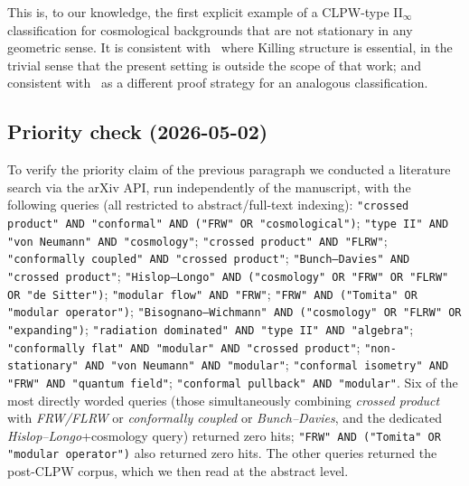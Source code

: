 \documentclass[11pt]{article}
\theoremstyle{definition}
\begin{document}
This is, to our knowledge, the first explicit example of a CLPW-type II$_\infty$ classification for cosmological backgrounds that are not stationary in any geometric sense. It is consistent with~\cite{FaulknerSperanza2024} where Killing structure is essential, in the trivial sense that the present setting is outside the scope of that work; and consistent with~\cite{CLPW2023, Witten2022} as a different proof strategy for an analogous classification.

\subsection*{Priority check (2026-05-02)}\label{sec:priority}

To verify the priority claim of the previous paragraph we conducted a literature search via the arXiv API, run independently of the manuscript, with the following queries (all restricted to abstract/full-text indexing): \texttt{"crossed product" AND "conformal" AND ("FRW" OR "cosmological")}; \texttt{"type II" AND "von Neumann" AND "cosmology"}; \texttt{"crossed product" AND "FLRW"}; \texttt{"conformally coupled" AND "crossed product"}; \texttt{"Bunch--Davies" AND "crossed product"}; \texttt{"Hislop--Longo" AND ("cosmology" OR "FRW" OR "FLRW" OR "de Sitter")}; \texttt{"modular flow" AND "FRW"}; \texttt{"FRW" AND ("Tomita" OR "modular operator")}; \texttt{"Bisognano--Wichmann" AND ("cosmology" OR "FLRW" OR "expanding")}; \texttt{"radiation dominated" AND "type II" AND "algebra"}; \texttt{"conformally flat" AND "modular" AND "crossed product"}; \texttt{"non-stationary" AND "von Neumann" AND "modular"}; \texttt{"conformal isometry" AND "FRW" AND "quantum field"}; \texttt{"conformal pullback" AND "modular"}. Six of the most directly worded queries (those simultaneously combining \emph{crossed product} with \emph{FRW/FLRW} or \emph{conformally coupled} or \emph{Bunch--Davies}, and the dedicated \emph{Hislop--Longo}+cosmology query) returned zero hits; \texttt{"FRW" AND ("Tomita" OR "modular operator")} also returned zero hits. The other queries returned the post-CLPW corpus, which we then read at the abstract level.
\end{document}
